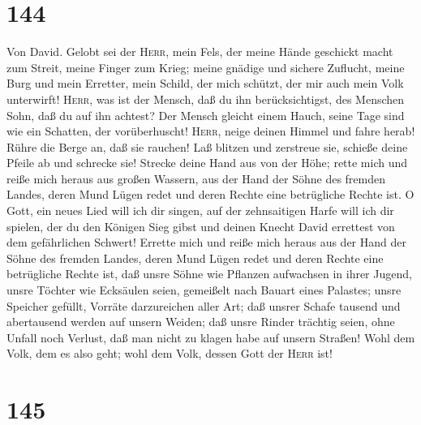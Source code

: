 \hypertarget{section-143}{%
\section{144}\label{section-143}}

 Von David. Gelobt sei der \textsc{Herr}, mein Fels, der
meine Hände geschickt macht zum Streit, meine Finger zum Krieg;
 meine gnädige und sichere Zuflucht, meine Burg und mein
Erretter, mein Schild, der mich schützt, der mir auch mein Volk
unterwirft!  \textsc{Herr}, was ist der Mensch, daß du ihn
berücksichtigst, des Menschen Sohn, daß du auf ihn achtest?
 Der Mensch gleicht einem Hauch, seine Tage sind wie ein
Schatten, der vorüberhuscht!  \textsc{Herr}, neige deinen
Himmel und fahre herab! Rühre die Berge an, daß sie rauchen!
 Laß blitzen und zerstreue sie, schieße deine Pfeile ab
und schrecke sie!  Strecke deine Hand aus von der Höhe;
rette mich und reiße mich heraus aus großen Wassern, aus der Hand der
Söhne des fremden Landes,  deren Mund Lügen redet und
deren Rechte eine betrügliche Rechte ist.  O Gott, ein
neues Lied will ich dir singen, auf der zehnsaitigen Harfe will ich dir
spielen,  der du den Königen Sieg gibst und deinen Knecht
David errettest von dem gefährlichen Schwert!  Errette
mich und reiße mich heraus aus der Hand der Söhne des fremden Landes,
deren Mund Lügen redet und deren Rechte eine betrügliche Rechte ist,
 daß unsre Söhne wie Pflanzen aufwachsen in ihrer Jugend,
unsre Töchter wie Ecksäulen seien, gemeißelt nach Bauart eines Palastes;
 unsre Speicher gefüllt, Vorräte darzureichen aller Art;
daß unsrer Schafe tausend und abertausend werden auf unsern Weiden;
 daß unsre Rinder trächtig seien, ohne Unfall noch
Verlust, daß man nicht zu klagen habe auf unsern Straßen!
 Wohl dem Volk, dem es also geht; wohl dem Volk, dessen
Gott der \textsc{Herr} ist!

\hypertarget{section-144}{%
\section{145}\label{section-144}}

